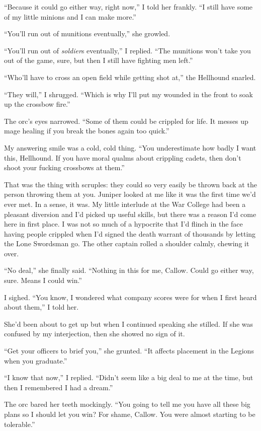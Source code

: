 \documentclass[12pt, openany]{book}
\begin{document}
“Because it could go either way, right now,” I told her frankly. “I still have some of my little minions and I can make more.”

“You’ll run out of munitions eventually,” she growled.

“You’ll run out of \textit{soldier}s eventually,” I replied. “The munitions won’t take you out of the game, sure, but then I still have fighting men left.”

“Who’ll have to cross an open field while getting shot at,” the Hellhound snarled.

“They will,” I shrugged. “Which is why I’ll put my wounded in the front to soak up the crossbow fire.”

The orc’s eyes narrowed. “Some of them could be crippled for life. It messes up mage healing if you break the bones again too quick.”

My answering smile was a cold, cold thing. “You underestimate how badly I want this, Hellhound. If you have moral qualms about crippling cadets, then don’t shoot your fucking crossbows at them.”

That was the thing with scruples: they could so very easily be thrown back at the person throwing them at you. Juniper looked at me like it was the first time we’d ever met. In a sense, it was. My little interlude at the War College had been a pleasant diversion and I’d picked up useful skills, but there was a reason I’d come here in first place. I was not so much of a hypocrite that I’d flinch in the face having people crippled when I’d signed the death warrant of thousands by letting the Lone Swordsman go. The other captain rolled a shoulder calmly, chewing it over.

“No deal,” she finally said. “Nothing in this for me, Callow. Could go either way, sure. Means I could win.”

I sighed. “You know, I wondered what company scores were for when I first heard about them,” I told her.

She’d been about to get up but when I continued speaking she stilled. If she was confused by my interjection, then she showed no sign of it.

“Get your officers to brief you,” she grunted. “It affects placement in the Legions when you graduate.”

“I know that now,” I replied. “Didn’t seem like a big deal to me at the time, but then I remembered I had a dream.”

The orc bared her teeth mockingly. “You going to tell me you have all these big plans so I should let you win? For shame, Callow. You were almost starting to be tolerable.”
\end{document}
